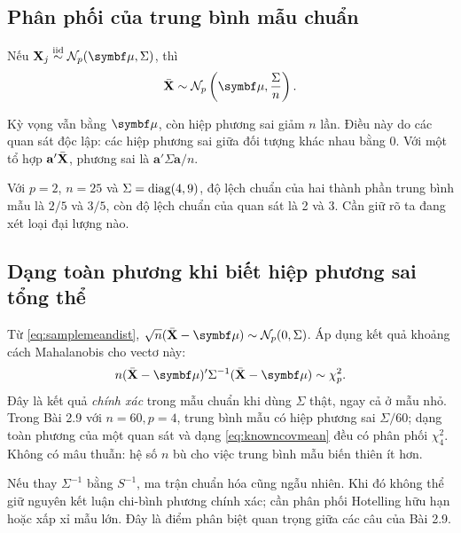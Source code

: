 \subsection{Phân phối của trung bình mẫu chuẩn}
\begin{result}
Nếu $\mathbf X_j\overset{\mathrm{iid}}\sim\N_p(\vmu,\Sigma)$, thì
\begin{equation}
 \Xbar\sim\N_p\left(\vmu,\frac{\Sigma}{n}\right).
 \label{eq:samplemeandist}
\end{equation}
\end{result}

Kỳ vọng vẫn bằng $\vmu$, còn hiệp phương sai giảm $n$ lần.
Điều này do các quan sát độc lập: các hiệp phương sai giữa đối tượng khác
nhau bằng 0. Với một tổ hợp $\mathbf a'\bar{\mathbf X}$, phương sai là
$\mathbf a'\Sigma\mathbf a/n$.


Với $p=2$, $n=25$ và $\Sigma=\operatorname{diag}(4,9)$, độ lệch chuẩn của hai thành
phần trung bình mẫu là $2/5$ và $3/5$, còn độ lệch chuẩn của quan sát là 2
và 3. Cần giữ rõ ta đang xét loại đại lượng nào.

\subsection{Dạng toàn phương khi biết hiệp phương sai tổng thể}
Từ \eqref{eq:samplemeandist}, $\sqrt n(\Xbar-\vmu)\sim\N_p(0,\Sigma)$.
Áp dụng kết quả khoảng cách Mahalanobis cho vectơ này:
\begin{equation}
 n(\Xbar-\vmu)'\Sigma^{-1}(\Xbar-\vmu)\sim\chi^2_p.
 \label{eq:knowncovmean}
\end{equation}
Đây là kết quả \emph{chính xác} trong mẫu chuẩn khi dùng $\Sigma$ thật,
ngay cả ở mẫu nhỏ. Trong Bài 2.9 với $n=60,p=4$, trung bình mẫu có
hiệp phương sai $\Sigma/60$; dạng toàn phương của một quan sát và dạng
\eqref{eq:knowncovmean} đều có phân phối $\chi^2_4$.
Không có mâu thuẫn: hệ số $n$ bù cho việc trung bình mẫu biến thiên ít hơn.

Nếu thay $\Sigma^{-1}$ bằng $S^{-1}$, ma trận chuẩn hóa cũng ngẫu nhiên.
Khi đó không thể giữ nguyên kết luận chi-bình phương chính xác; cần
phân phối Hotelling hữu hạn hoặc xấp xỉ mẫu lớn. Đây là điểm phân biệt
quan trọng giữa các câu của Bài 2.9.

